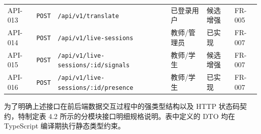 \begin{longtable}{@{}p{1.35cm} p{1.05cm} p{4.1cm} p{2.0cm} p{1.8cm} p{1.45cm}@{}}
API-013 & \texttt{POST} & \texttt{/api/\allowbreak v1/\allowbreak translate} & 已登录用户 & 候选增强 & FR-005 \\
API-014 & \texttt{POST} & \texttt{/api/\allowbreak v1/\allowbreak live-\allowbreak sessions} & 教师/管理员 & 已实现 & FR-007 \\
API-015 & \texttt{POST} & \texttt{/api/\allowbreak v1/\allowbreak live-\allowbreak sessions/\allowbreak :id/\allowbreak signals} & 教师/学生 & 候选增强 & FR-007 \\
API-016 & \texttt{POST} & \texttt{/api/\allowbreak v1/\allowbreak live-\allowbreak sessions/\allowbreak :id/\allowbreak presence} & 教师/学生 & 已实现 & FR-007 \\
\end{longtable}
\endgroup

为了明确上述接口在前后端数据交互过程中的强类型结构以及 HTTP 状态码契约，特制定表 4.2 所示的分模块接口明细规格说明。表中定义的 DTO 均在 TypeScript 编译期执行静态类型约束。

